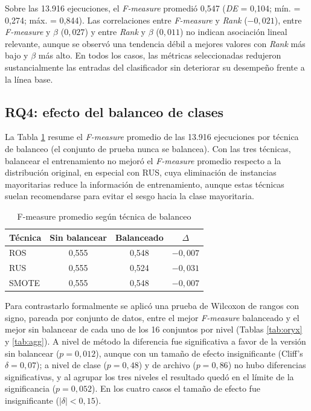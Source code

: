 \documentclass[conference,a4paper]{IEEEtran}
\begin{document}
Sobre las 13.916 ejecuciones, el \textit{F-measure} promedió 0,547 (\textit{DE} = 0,104; mín. = 0,274; máx. = 0,844). Las correlaciones entre \textit{F-measure} y \textit{Rank} ($-0{,}021$), entre \textit{F-measure} y $\beta$ ($0{,}027$) y entre \textit{Rank} y $\beta$ ($0{,}011$) no indican asociación lineal relevante, aunque se observó una tendencia débil a mejores valores con \textit{Rank} más bajo y $\beta$ más alto. En todos los casos, las métricas seleccionadas redujeron sustancialmente las entradas del clasificador sin deteriorar su desempeño frente a la línea base.

\subsection{RQ4: efecto del balanceo de clases}
\label{sec:RQ4}

La Tabla \ref{tab:balance} resume el \textit{F-measure} promedio de las 13.916 ejecuciones por técnica de balanceo (el conjunto de prueba nunca se balancea). Con las tres técnicas, balancear el entrenamiento no mejoró el \textit{F-measure} promedio respecto a la distribución original, en especial con RUS, cuya eliminación de instancias mayoritarias reduce la información de entrenamiento, aunque estas técnicas suelan recomendarse para evitar el sesgo hacia la clase mayoritaria.

\begin{table}[H]
\caption{F-measure promedio según técnica de balanceo}
\label{tab:balance}
\centering
\begin{tabular}{lccc}
\toprule
Técnica & Sin balancear & Balanceado & $\Delta$ \\
\midrule
ROS   & 0,555 & 0,548 & $-0,007$ \\
RUS   & 0,555 & 0,524 & $-0,031$ \\
SMOTE & 0,555 & 0,548 & $-0,007$ \\
\bottomrule
\end{tabular}
\end{table}

Para contrastarlo formalmente se aplicó una prueba de Wilcoxon de rangos con signo, pareada por conjunto de datos, entre el mejor \textit{F-measure} balanceado y el mejor sin balancear de cada uno de los 16 conjuntos por nivel (Tablas \ref{tab:oryx} y \ref{tab:agg}). A nivel de método la diferencia fue significativa a favor de la versión sin balancear ($p = 0{,}012$), aunque con un tamaño de efecto insignificante (Cliff's $\delta = 0{,}07$); a nivel de clase ($p = 0{,}48$) y de archivo ($p = 0{,}86$) no hubo diferencias significativas, y al agrupar los tres niveles el resultado quedó en el límite de la significancia ($p = 0{,}052$). En los cuatro casos el tamaño de efecto fue insignificante ($|\delta| < 0{,}15$).
\end{document}

